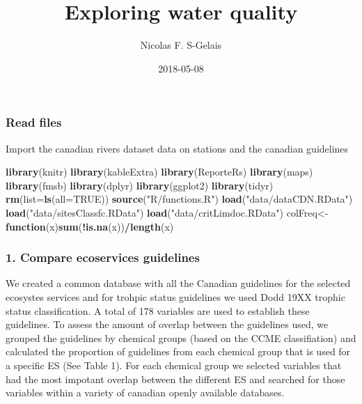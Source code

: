 \documentclass[]{article}
\title{Exploring water quality}
\author{Nicolas F. S-Gelais}
\date{2018-05-08}
\newenvironment{Shaded}{\begin{snugshade}}{\end{snugshade}}
\newcommand{\KeywordTok}[1]{\textcolor[rgb]{0.13,0.29,0.53}{\textbf{#1}}}
\newcommand{\DataTypeTok}[1]{\textcolor[rgb]{0.13,0.29,0.53}{#1}}
\newcommand{\StringTok}[1]{\textcolor[rgb]{0.31,0.60,0.02}{#1}}
\newcommand{\OtherTok}[1]{\textcolor[rgb]{0.56,0.35,0.01}{#1}}
\newcommand{\ControlFlowTok}[1]{\textcolor[rgb]{0.13,0.29,0.53}{\textbf{#1}}}
\newcommand{\OperatorTok}[1]{\textcolor[rgb]{0.81,0.36,0.00}{\textbf{#1}}}
\newcommand{\NormalTok}[1]{#1}
\begin{document}
\maketitle

\subsubsection{Read files}\label{read-files}

Import the canadian rivers dataset data on stations and the canadian
guidelines

\begin{Shaded}
\begin{Highlighting}[]
\KeywordTok{library}\NormalTok{(knitr)}
\KeywordTok{library}\NormalTok{(kableExtra)}
\KeywordTok{library}\NormalTok{(ReporteRs)}
\KeywordTok{library}\NormalTok{(maps)}
\KeywordTok{library}\NormalTok{(fmsb)}
\KeywordTok{library}\NormalTok{(dplyr)}
\KeywordTok{library}\NormalTok{(ggplot2)}
\KeywordTok{library}\NormalTok{(tidyr)}
\KeywordTok{rm}\NormalTok{(}\DataTypeTok{list=}\KeywordTok{ls}\NormalTok{(}\DataTypeTok{all=}\OtherTok{TRUE}\NormalTok{))}
\KeywordTok{source}\NormalTok{(}\StringTok{"R/functions.R"}\NormalTok{)}
\KeywordTok{load}\NormalTok{(}\StringTok{"data/dataCDN.RData"}\NormalTok{)}
\KeywordTok{load}\NormalTok{(}\StringTok{"data/sitesClassfc.RData"}\NormalTok{)}
\KeywordTok{load}\NormalTok{(}\StringTok{"data/critLimdoc.RData"}\NormalTok{)}
\NormalTok{colFreq<-}\ControlFlowTok{function}\NormalTok{(x)}\KeywordTok{sum}\NormalTok{(}\OperatorTok{!}\KeywordTok{is.na}\NormalTok{(x))}\OperatorTok{/}\KeywordTok{length}\NormalTok{(x)}
\end{Highlighting}
\end{Shaded}

\subsubsection{1. Compare ecoservices
guidelines}\label{compare-ecoservices-guidelines}

We created a common database with all the Canadian guidelines for the
selected ecosystes services and for trohpic status guidelines we used
Dodd 19XX trophic status classification. A total of 178 variables are
used to establish these guidelines. To assess the amount of overlap
between the guidelines used, we grouped the guidelines by chemical
groups (based on the CCME classifiation) and calculated the proportion
of guidelines from each chemical group that is used for a specific ES
(See Table 1). For each chemical group we selected variables that had
the most impotant overlap between the different ES and searched for
those variables within a variety of canadian openly available databases.
\end{document}
